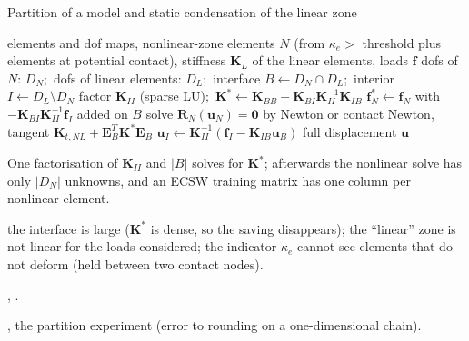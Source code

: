 
\begin{algbox}{Partition of a model and static condensation of the linear zone}
\begin{pseudo}
\Require elements and dof maps, nonlinear-zone elements $N$ (from $\kappa_e>$ threshold plus elements at potential contact), stiffness $\bm K_L$ of the linear elements, loads $\bm f$
\State dofs of $N$: $D_N$;\ dofs of linear elements: $D_L$;\ interface $B\gets D_N\cap D_L$;\ interior $I\gets D_L\setminus D_N$
\State factor $\bm K_{II}$ (sparse LU);\ $\bm K^\ast\gets\bm K_{BB}-\bm K_{BI}\bm K_{II}^{-1}\bm K_{IB}$ 
\State $\bm f^\ast_N\gets\bm f_N$ with $-\bm K_{BI}\bm K_{II}^{-1}\bm f_I$ added on $B$
\State solve $\bm R_N(\bm u_N)=\bm 0$ by Newton or contact Newton, tangent $\bm K_{t,NL}+\bm E_B^T\bm K^\ast\bm E_B$
\State $\bm u_I\gets\bm K_{II}^{-1}(\bm f_I-\bm K_{IB}\bm u_B)$
\Ensure full displacement $\bm u$
\end{pseudo}
\begin{algdet}
\item[Cost] One factorisation of $\bm K_{II}$ and $|B|$ solves for $\bm K^\ast$; afterwards the nonlinear solve has only $|D_N|$ unknowns, and an ECSW training matrix has one column per nonlinear element.
\item[Fails when] the interface is large ($\bm K^\ast$ is dense, so the saving disappears); the ``linear'' zone is not linear for the loads considered; the indicator $\kappa_e$ cannot see elements that do not deform (held between two contact nodes).
\item[Code] , .
\item[Verified in] , the partition experiment (error to rounding on a one-dimensional chain).
\end{algdet}
\end{algbox}

